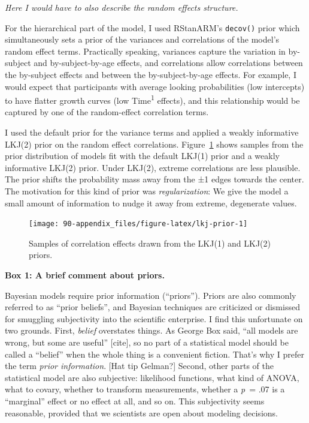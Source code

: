 \documentclass [11pt, proquest] {uwthesis}[2015/03/03]
\begin{document}
\emph{Here I would have to also describe the random effects structure.}

For the hierarchical part of the model, I used RStanARM's
\texttt{decov()} prior which simultaneously sets a prior of the
variances and correlations of the model's random effect terms.
Practically speaking, variances capture the variation in by-subject and
by-subject-by-age effects, and correlations allow correlations between
the by-subject effects and between the by-subject-by-age effects. For
example, I would expect that participants with average looking
probabilities (low intercepts) to have flatter growth curves (low
Time\textsuperscript{1} effects), and this relationship would be
captured by one of the random-effect correlation terms.

I used the default prior for the variance terms and applied a weakly
informative LKJ(2) prior on the random effect correlations.
Figure~\ref{fig:lkj-prior} shows samples from the prior distribution of
models fit with the default LKJ(1) prior and a weakly informative LKJ(2)
prior. Under LKJ(2), extreme correlations are less plausible. The prior
shifts the probability mass away from the ±1 edges towards the center.
The motivation for this kind of prior was \emph{regularization}: We give
the model a small amount of information to nudge it away from extreme,
degenerate values.



\begin{figure}
\texttt{[image: 90-appendix\_files/figure-latex/lkj-prior-1]} \caption{Samples of correlation effects drawn from the LKJ(1) and
LKJ(2) priors.}\label{fig:lkj-prior}
\end{figure}
\textbf{Box 1: A brief comment about priors.}

Bayesian models require prior information (``priors''). Priors are also
commonly referred to as ``prior beliefs'', and Bayesian techniques are
criticized or dismissed for smuggling subjectivity into the scientific
enterprise. I find this unfortunate on two grounds. First, \emph{belief}
overstates things. As George Box said, ``all models are wrong, but some
are useful'' {[}cite{]}, so no part of a statistical model should be
called a ``belief'' when the whole thing is a convenient fiction. That's
why I prefer the term \emph{prior information}. {[}Hat tip Gelman?{]}
Second, other parts of the statistical model are also subjective:
likelihood functions, what kind of ANOVA, what to covary, whether to
transform measurements, whether a \emph{p}~= .07 is a ``marginal''
effect or no effect at all, and so on. This subjectivity seems
reasonable, provided that we scientists are open about modeling
decisions.
\end{document}
